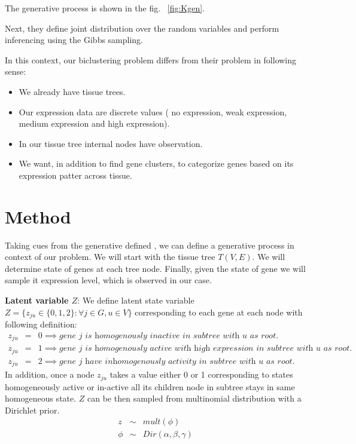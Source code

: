 \documentclass{article}
\begin{document}
The generative process is shown in the fig. ~\ref{fig:Kgen}.
 
Next, they define joint distribution over the random variables and perform inferencing using the Gibbs
sampling.

\par In this context, our biclustering problem differs from their problem in following sense:
\begin{itemize}
	\item We already have tissue trees.
	\item Our expression data are discrete values ( no expression, weak expression, medium expression and
		high expression).
	\item In our tissue tree internal nodes have observation.
	\item We want, in addition to find gene clusters, to categorize genes based on its expression patter 
		across tissue.
\end{itemize}
\section{Method}
Taking cues from the generative defined \cite{Kaski2010}, we can define a generative process in context of our problem. We will start with the tissue tree $T(V,E)$. We will determine state of genes at each tree node. Finally, given the state of gene we will sample it expression level, which is 
observed in our case. 
\par \textbf{Latent variable $Z$}:
We define latent state variable $Z= \{z_{ju} \in\{0,1,2\} : \forall j \in G, u \in V\}$ corresponding to each gene at each node with following definition:
\begin{eqnarray}
	z_{ju} &=& 0 \implies \textit{gene $j$ is homogenously inactive in subtree with $u$ as root.} \nonumber\\ 
	z_{ju} &=& 1 \implies \textit{gene $j$ is homogenously active with high expression in subtree with  $u$ as root.} \nonumber \\
	z_{ju} &=& 2 \implies \textit{gene $j$ have inhomogenously activity in subtree with $u$ as root.} \nonumber 
\end{eqnarray}
In addition, once a node $z_{ju}$ takes a value either 0 or 1 corresponding to states homogeneously active or in-active all its children 
node in subtree stays in same homogeneous state. $Z$ can be then sampled from multinomial distribution with a Dirichlet prior.
\begin{eqnarray}
	z &\sim& mult(\phi) \nonumber \\
	\phi &\sim&  Dir(\alpha,\beta,\gamma) \nonumber
	\label{eqn:zdist}
\end{eqnarray}
\end{document}
